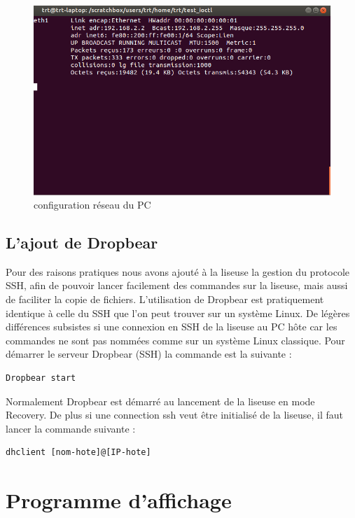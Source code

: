 \begin{figure}[]
	\begin{center}
		\includegraphics[scale=0.5]{capt_pc_ifconfig.png}
	\end{center}
	\caption{configuration réseau du PC}
\end{figure}
\clearpage
\subsection{L'ajout de Dropbear}
Pour des raisons pratiques nous avons ajouté à la liseuse la gestion du protocole SSH, afin de pouvoir lancer facilement des commandes sur la liseuse, mais aussi de faciliter la copie de fichiers.
L'utilisation de Dropbear est pratiquement identique à celle du SSH que l'on peut trouver sur un système Linux. De légères différences subsistes si une connexion en SSH de la liseuse au PC hôte car les commandes ne sont pas nommées comme sur un système Linux classique. Pour démarrer le serveur Dropbear (SSH) la commande est la suivante : 

\begin{lstlisting}
Dropbear start
\end{lstlisting}

Normalement Dropbear est démarré au lancement de la liseuse en mode Recovery. De plus si une connection ssh veut être initialisé de la liseuse, il faut lancer la commande suivante :

\begin{lstlisting}
dhclient [nom-hote]@[IP-hote]
\end{lstlisting}


\newpage

\section{Programme d'affichage}

